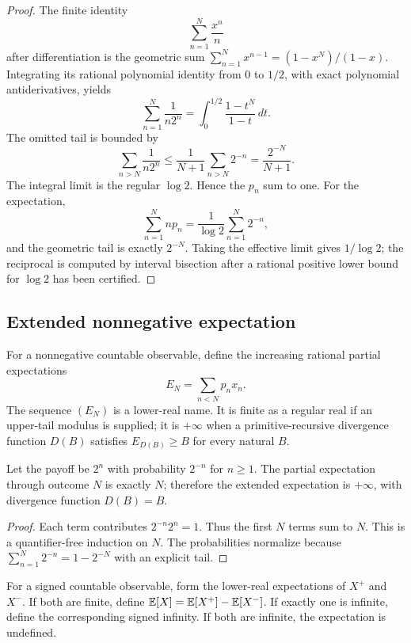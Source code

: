 \begin{proof}
The finite identity
\[
 \sum_{n=1}^{N}\frac{x^n}{n}
\]
after differentiation is the geometric sum
\(\sum_{n=1}^{N}x^{n-1}=(1-x^N)/(1-x)\).  Integrating its rational polynomial
identity from \(0\) to \(1/2\), with exact polynomial antiderivatives, yields
\[
 \sum_{n=1}^{N}\frac1{n2^n}
 =\int_0^{1/2}\frac{1-t^N}{1-t}\,dt.
\]
The omitted tail is bounded by
\[
 \sum_{n>N}\frac1{n2^n}
 \le\frac1{N+1}\sum_{n>N}2^{-n}
 =\frac{2^{-N}}{N+1}.
\]
The integral limit is the regular \(\log2\).  Hence the \(p_n\) sum to one.
For the expectation,
\[
 \sum_{n=1}^{N}np_n
 =\frac1{\log2}\sum_{n=1}^{N}2^{-n},
\]
and the geometric tail is exactly \(2^{-N}\).  Taking the effective limit gives
\(1/\log2\); the reciprocal is computed by interval bisection after a rational
positive lower bound for \(\log2\) has been certified.
\end{proof}

\subsection{Extended nonnegative expectation}

\begin{definition}\label{def:lower-expect}
For a nonnegative countable observable, define the increasing rational partial
expectations
\[
 E_N=\sum_{n<N}p_nx_n.
\]
The sequence \((E_N)\) is a lower-real name.  It is finite as a regular real if
an upper-tail modulus is supplied; it is \(+\infty\) when a primitive-recursive
divergence function \(D(B)\) satisfies \(E_{D(B)}\ge B\) for every natural
\(B\).
\end{definition}

\begin{proposition}\label{prop:st-petersburg}
Let the payoff be \(2^n\) with probability \(2^{-n}\) for \(n\ge1\).  The
partial expectation through outcome \(N\) is exactly \(N\); therefore the
extended expectation is \(+\infty\), with divergence function \(D(B)=B\).
\end{proposition}

\begin{proof}
Each term contributes \(2^{-n}2^n=1\).  Thus the first \(N\) terms sum to
\(N\).  This is a quantifier-free induction on \(N\).  The probabilities
normalize because \(\sum_{n=1}^{N}2^{-n}=1-2^{-N}\) with an explicit tail.
\end{proof}

\begin{definition}\label{def:signed-extended}
For a signed countable observable, form the lower-real expectations of
\(X^+\) and \(X^-\).  If both are finite, define
\(\mathbb E[X]=\mathbb E[X^+]-\mathbb E[X^-]\).  If exactly one is infinite, define the corresponding
signed infinity.  If both are infinite, the expectation is undefined.
\end{definition}

